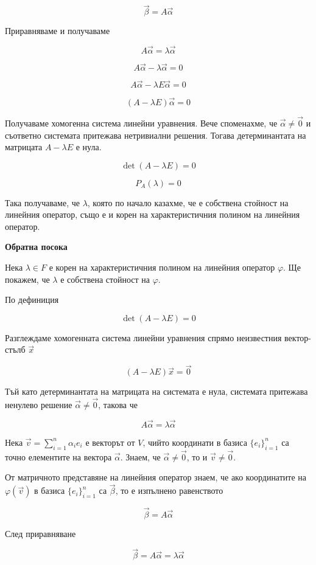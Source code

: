 \documentclass{scrartcl}
\begin{document}
\begin{FlushLeft}
$$\vec{\beta} = A \vec{\alpha}$$

Приравняваме и получаваме

$$A \vec{\alpha} = \lambda \vec{\alpha}$$

$$A \vec{\alpha} - \lambda \vec{\alpha} = 0$$

$$A \vec{\alpha} - \lambda E \vec{\alpha} = 0$$

$$(A  - \lambda E) \vec{\alpha} = 0$$

Получаваме хомогенна система линейни уравнения. Вече споменахме, че $\vec{\alpha} \ne \vec{0}$ и съответно системата притежава нетривиални решения. Тогава детерминантата на матрицата $A - \lambda E$ е нула.

$$\det{(A - \lambda E)} = 0$$

$$P_A(\lambda) = 0$$

Така получаваме, че $\lambda$, която по начало казахме, че е собствена стойност на линейния оператор, също е и корен на характеристичния полином на линейния оператор.

\textbf{Обратна посока}

Нека $\lambda \in F$ е корен на характеристичния полином на линейния оператор $\varphi$. Ще покажем, че $\lambda$ е собствена стойност на $\varphi$.

По дефиниция

$$\det(A - \lambda E) = 0$$

Разглеждаме хомогенната система линейни уравнения спрямо неизвестния вектор-стълб $\vec{x}$

$$(A - \lambda E)\vec{x} = \vec{0}$$

Тъй като детерминантата на матрицата на системата е нула, системата притежава ненулево решение $\vec{\alpha} \neq \vec{0}$, такова че

$$A \vec{\alpha} = \lambda \vec{\alpha}$$

Нека $\vec{v} = \sum_{i=1}^n \alpha_i e_i$ е векторът от $V$, чийто координати в базиса $\{e_i\}_{i=1}^n$ са точно елементите на вектора $\vec{\alpha}$. Знаем, че $\vec{\alpha} \neq \vec{0}$, то и $\vec{v} \neq \vec{0}$.

От матричното представяне на линейния оператор знаем, че ако координатите на $\varphi(\vec{v})$ в базиса $\{e_i\}_{i=1}^n$ са $\vec{\beta}$, то е изпълнено равенството 

$$\vec{\beta} = A \vec{\alpha}$$

След приравняване

$$\vec{\beta} = A \vec{\alpha} = \lambda \vec{\alpha}$$


\end{FlushLeft}
\end{document}
